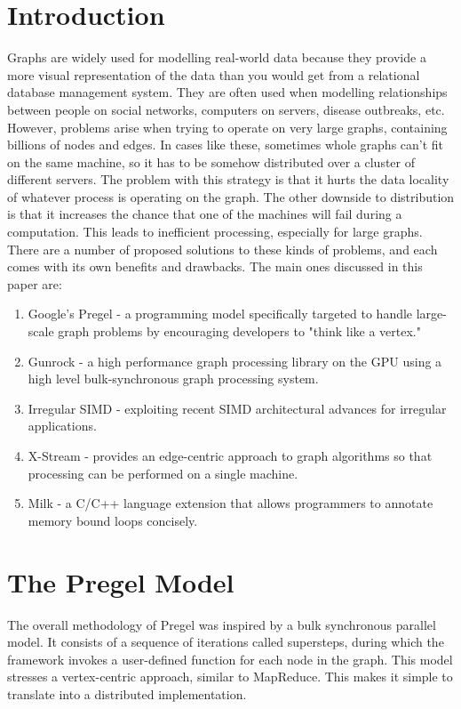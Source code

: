 \documentclass[conference]{IEEEtran}
\begin{document}
\linespread{1.5}

\section{Introduction}

Graphs are widely used for modelling real-world data because they provide a more visual representation of the data than you would get from a relational database management system.  They are often used when modelling relationships between people on social networks, computers on servers, disease outbreaks, etc.  However, problems arise when trying to operate on very large graphs, containing billions of nodes and edges.  In cases like these, sometimes whole graphs can't fit on the same machine, so it has to be somehow distributed over a cluster of different servers.  The problem with this strategy is that it hurts the data locality of whatever process is operating on the graph.  The other downside to distribution is that it increases the chance that one of the machines will fail during a computation.  This leads to inefficient processing, especially for large graphs.  There are a number of proposed solutions to these kinds of problems, and each comes with its own benefits and drawbacks.  The main ones discussed in this paper are:
\begin{enumerate}
\item Google's Pregel - a programming model specifically targeted to handle large-scale graph problems by encouraging developers to "think like a vertex."
\item Gunrock - a high performance graph processing library on the GPU using a high level bulk-synchronous graph processing system.  
\item Irregular SIMD - exploiting recent SIMD architectural advances for irregular applications.  
\item X-Stream - provides an edge-centric approach to graph algorithms so that processing can be performed on a single machine.  
\item Milk - a C/C++ language extension that allows programmers to annotate memory bound loops concisely.  
\end{enumerate}

\section{The Pregel Model}

The overall methodology of Pregel was inspired by a bulk synchronous parallel model.  It consists of a sequence of iterations called supersteps, during which the framework invokes a user-defined function for each node in the graph.  This model stresses a vertex-centric approach, similar to MapReduce.  This makes it simple to translate into a distributed implementation.  
\end{document}
